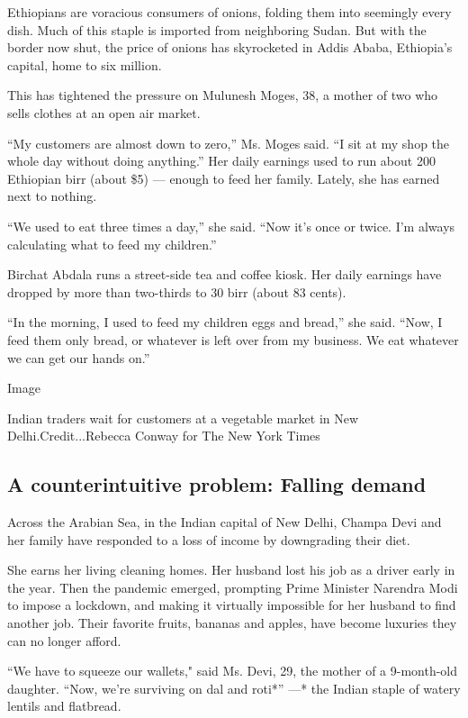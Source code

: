 Ethiopians are voracious consumers of onions, folding them into
seemingly every dish. Much of this staple is imported from neighboring
Sudan. But with the border now shut, the price of onions has skyrocketed
in Addis Ababa, Ethiopia's capital, home to six million.

This has tightened the pressure on Mulunesh Moges, 38, a mother of two
who sells clothes at an open air market.

``My customers are almost down to zero,'' Ms. Moges said. ``I sit at my
shop the whole day without doing anything.'' Her daily earnings used to
run about 200 Ethiopian birr (about \$5) --- enough to feed her family.
Lately, she has earned next to nothing.

``We used to eat three times a day,'' she said. ``Now it's once or
twice. I'm always calculating what to feed my children.''

Birchat Abdala runs a street-side tea and coffee kiosk. Her daily
earnings have dropped by more than two-thirds to 30 birr (about 83
cents).

``In the morning, I used to feed my children eggs and bread,'' she said.
``Now, I feed them only bread, or whatever is left over from my
business. We eat whatever we can get our hands on.''

Image

Indian traders wait for customers at a vegetable market in New
Delhi.Credit...Rebecca Conway for The New York Times

\hypertarget{a-counterintuitive-problem-falling-demand}{%
\subsection{A counterintuitive problem: Falling
demand}\label{a-counterintuitive-problem-falling-demand}}

Across the Arabian Sea, in the Indian capital of New Delhi, Champa Devi
and her family have responded to a loss of income by downgrading their
diet.

She earns her living cleaning homes. Her husband lost his job as a
driver early in the year. Then the pandemic emerged, prompting Prime
Minister Narendra Modi to impose a lockdown, and making it virtually
impossible for her husband to find another job. Their favorite fruits,
bananas and apples, have become luxuries they can no longer afford.

``We have to squeeze our wallets," said Ms. Devi, 29, the mother of a
9-month-old daughter. ``Now, we're surviving on dal and roti*'' ---* the
Indian staple of watery lentils and flatbread.


